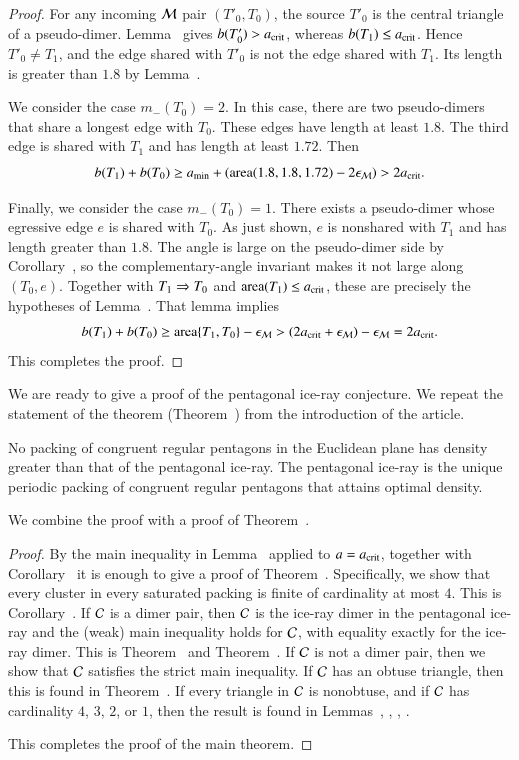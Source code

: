 \begin{proof}
For any incoming $\mathcal M$ pair $(T'_0,T_0)$, the source $T'_0$ is the
central triangle of a pseudo-dimer.  Lemma~ gives
$b(T'_0)>a_\text{crit}$, whereas $b(T_1)\le a_\text{crit}$.  Hence $T'_0\ne T_1$,
and the edge shared with $T'_0$ is not the edge shared with $T_1$.
Its length is greater than $1.8$ by Lemma~.

We consider the case $m_-(T_0)=2$.  In this case, there are two
pseudo-dimers that share a longest edge with $T_0$.  These edges have
length at least $1.8$. The third edge is shared with $T_1$ and has
length at least $1.72$.  Then
\[
b(T_1)+b(T_0) 
\ge a_\text{min} + ({\operatorname{area}} (1.8,1.8,1.72) - 2\epsilon_{\mathcal M}) > 2a_\text{crit}.
\]

Finally, we consider the case $m_-(T_0)=1$.  There exists a
pseudo-dimer whose egressive edge $e$ is shared with $T_0$.
As just shown, $e$ is nonshared with $T_1$ and has length greater
than $1.8$.  The angle is large on the pseudo-dimer side by
Corollary~, so the complementary-angle invariant
makes it not large along $(T_0,e)$.  Together with
$T_1\Rightarrow T_0$ and ${\operatorname{area}}(T_1)\le a_\text{crit}$, these are precisely the
hypotheses of Lemma~.  That lemma
implies
\[
b(T_1) + b(T_0) \ge {\operatorname{area}}\{T_1,T_0\} - \epsilon_{\mathcal M} 
> (2a_\text{crit}  +\epsilon_{\mathcal M}) - \epsilon_{\mathcal M} = 2a_\text{crit}.
\]
This completes the proof.
\end{proof}

We are ready to give a proof of the pentagonal ice-ray conjecture. We
repeat the statement of the theorem (Theorem~) from the
introduction of the article.

\begin{theorem}   
  No packing of congruent regular pentagons in the Euclidean plane has
  density greater than that of the pentagonal ice-ray.  The pentagonal
  ice-ray is the unique periodic packing of congruent regular
  pentagons that attains optimal density.
\end{theorem}

We combine the proof with a proof of Theorem~.

\begin{proof}
  By the main inequality in Lemma~ applied to
  $a=a_\text{crit}$, together with Corollary~ it is enough to
  give a proof of Theorem~.  Specifically, we show that
  every cluster in every saturated packing is finite of cardinality at
  most $4$.  This is Corollary~.  If $\mathcal C$ is a dimer
  pair, then $\mathcal C$ is the ice-ray dimer in the pentagonal ice-ray and
  the (weak) main inequality holds for $\mathcal C$, with equality exactly for
  the ice-ray dimer.  This is Theorem~ and
  Theorem~.  If $\mathcal C$ is not a dimer pair, then we
  show that $\mathcal C$ satisfies the strict main inequality.  If $\mathcal C$ has an
  obtuse triangle, then this is found in Theorem~.  If
  every triangle in $\mathcal C$ is nonobtuse, and if $\mathcal C$ has cardinality
  $4$, $3$, $2$, or $1$, then the result is found in
  Lemmas~, , ,
  .

  This completes the proof of the main theorem.
\end{proof}

